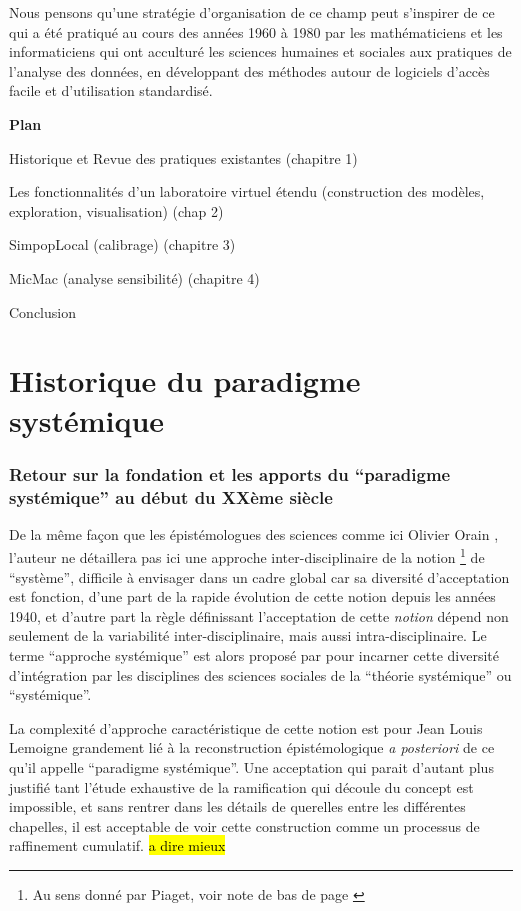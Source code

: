 Nous pensons qu’une stratégie d’organisation de ce champ peut s’inspirer  de ce qui a été pratiqué au cours des années 1960 à 1980 par les mathématiciens et les informaticiens qui ont acculturé les sciences humaines et sociales aux pratiques de l'analyse des données, en développant des méthodes autour de logiciels d'accès facile et d'utilisation standardisé.


\textbf{Plan}

Historique et Revue des pratiques existantes (chapitre 1)

Les fonctionnalités d’un laboratoire virtuel étendu (construction des modèles, exploration, visualisation) (chap 2)

SimpopLocal (calibrage) (chapitre 3)

MicMac (analyse sensibilité) (chapitre 4)

Conclusion

\appendix

\chapter{Historique du paradigme systémique}

\subsection{Retour sur la fondation et les apports du \enquote{paradigme systémique} au début du XXème siècle}
\label{ssec:systemique}

De la même façon que les épistémologues des sciences comme ici Olivier Orain \autocite{Orain2001}, l'auteur ne détaillera pas ici une approche inter-disciplinaire de la notion \footnote{Au sens donné par Piaget, voir note de bas de page \autocite {Orain2001}} de \enquote{système}, difficile à envisager dans un cadre global car sa diversité d'acceptation est fonction, d'une part de la rapide évolution de cette notion depuis les années 1940, et d'autre part la règle définissant l'acceptation de cette \textit{notion} dépend non seulement de la variabilité inter-disciplinaire, mais aussi intra-disciplinaire. Le terme \enquote{approche systémique} est alors proposé par \autocite{Orain2001} pour incarner cette diversité d'intégration par les disciplines des sciences sociales de la \enquote{théorie systémique} ou \enquote{systémique}.

La complexité d'approche caractéristique de cette notion est pour Jean Louis Lemoigne grandement lié à la reconstruction épistémologique \textit{a posteriori} de ce qu'il appelle \enquote{paradigme systémique}. Une acceptation qui parait d'autant plus justifié tant l'étude exhaustive de la ramification qui découle du concept est impossible, et sans rentrer dans les détails de querelles entre les différentes chapelles, il est acceptable de voir cette construction comme un processus de raffinement cumulatif. \hl{a dire mieux}

